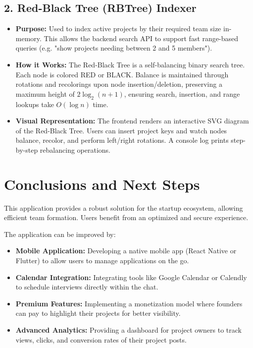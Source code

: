 \documentclass[12pt,a4paper]{article}
\begin{document}
\subsection{2. Red-Black Tree (RBTree) Indexer}
\begin{itemize}
    \item \textbf{Purpose:} Used to index active projects by their required team size in-memory. This allows the backend search API to support fast range-based queries (e.g. "show projects needing between 2 and 5 members").
    \item \textbf{How it Works:} The Red-Black Tree is a self-balancing binary search tree. Each node is colored RED or BLACK. Balance is maintained through rotations and recolorings upon node insertion/deletion, preserving a maximum height of $2 \log_2(n + 1)$, ensuring search, insertion, and range lookups take $O(\log n)$ time.
    \item \textbf{Visual Representation:} The frontend renders an interactive SVG diagram of the Red-Black Tree. Users can insert project keys and watch nodes balance, recolor, and perform left/right rotations. A console log prints step-by-step rebalancing operations.
\end{itemize}

\section{Conclusions and Next Steps}
This application provides a robust solution for the startup ecosystem, allowing efficient team formation. Users benefit from an optimized and secure experience.

The application can be improved by:
\begin{itemize}
    \item \textbf{Mobile Application:} Developing a native mobile app (React Native or Flutter) to allow users to manage applications on the go.
    \item \textbf{Calendar Integration:} Integrating tools like Google Calendar or Calendly to schedule interviews directly within the chat.
    \item \textbf{Premium Features:} Implementing a monetization model where founders can pay to highlight their projects for better visibility.
    \item \textbf{Advanced Analytics:} Providing a dashboard for project owners to track views, clicks, and conversion rates of their project posts.
\end{itemize}
\end{document}
